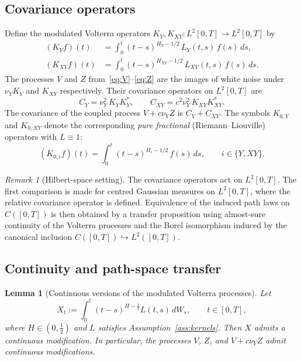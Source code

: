 \documentclass[11pt,a4paper]{amsart}
\theoremstyle{plain}
\newtheorem{lemma}[theorem]{Lemma}
\theoremstyle{definition}
\theoremstyle{remark}
\newtheorem{remark}[theorem]{Remark}
\begin{document}
\subsection*{Covariance operators}
Define the modulated Volterra operators $K_Y, K_{XY}:L^2[0,T]\to L^2[0,T]$ by
\begin{equation}\label{eq:KY}
\begin{aligned}
(K_Y f)(t)
&=
\int_0^t (t-s)^{H_Y - 1/2}\, L_Y(t,s)\, f(s)\, ds,\\
(K_{XY} f)(t)
&=
\int_0^t (t-s)^{H_{XY}-1/2}\, L_{XY}(t,s)\, f(s)\, ds.
\end{aligned}
\end{equation}
The processes $V$ and $Z$ from~\eqref{eq:V}--\eqref{eq:Z} are the images of white noise under $\nu_Y K_Y$ and $K_{XY}$ respectively. Their covariance operators on $L^2[0,T]$ are
\begin{equation}\label{eq:covops}
C_Y = \nu_Y^2\, K_Y K_Y^*,\qquad C_{XY} = c^2\nu_Y^2\, K_{XY} K_{XY}^*.
\end{equation}
The covariance of the coupled process $V + c\nu_Y Z$ is $C_Y + C_{XY}$. The symbols $K_{0,Y}$ and $K_{0,XY}$ denote the corresponding \emph{pure fractional} (Riemann--Liouville) operators with $L\equiv 1$:
\begin{equation}\label{eq:K0}
(K_{0,i} f)(t) = \int_0^t (t-s)^{H_i - 1/2}\, f(s)\, ds,\qquad i\in\{Y,XY\}.
\end{equation}

\begin{remark}[Hilbert-space setting]
The covariance operators act on $L^2[0,T]$.  The first comparison is made for centred Gaussian
measures on $L^2[0,T]$, where the relative covariance operator is defined.  Equivalence of the
induced path laws on $C([0,T])$ is then obtained by a transfer proposition using almost-sure
continuity of the Volterra processes and the Borel isomorphism induced by the canonical inclusion
$C([0,T])\hookrightarrow L^2([0,T])$.
\end{remark}

\subsection*{Continuity and path-space transfer}

\begin{lemma}[Continuous versions of the modulated Volterra processes]\label{lem:contpaths}
Let
\[
X_t:=\int_0^t (t-s)^{H-\frac12}L(t,s)\,dW_s,
\qquad t\in[0,T],
\]
where $H\in(0,\tfrac12)$ and $L$ satisfies Assumption~\ref{ass:kernels}. Then $X$ admits a continuous modification. In particular, the processes $V$, $Z$, and $V+c\nu_Y Z$ admit continuous modifications.
\end{lemma}
\end{document}
